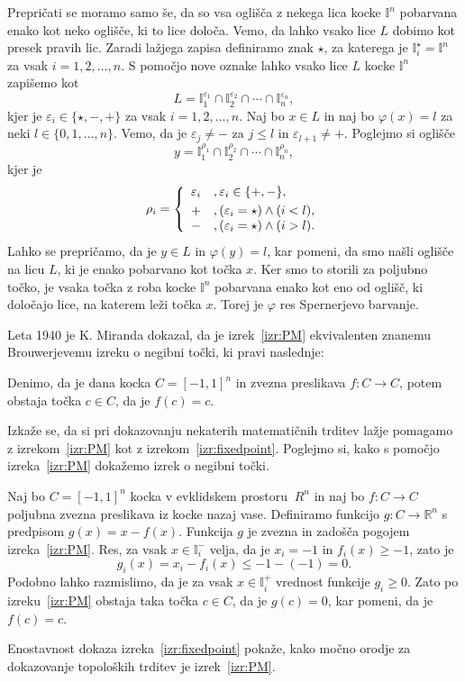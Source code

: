 \documentclass[mat1]{fmfdelo}
\newcommand{\R}{\mathbb R}
\newcommand{\I}{\mathbb I}
\newcommand{\0}{0}
\begin{document}
\begin{dokaz}
Prepričati se moramo samo še, da so vsa oglišča z nekega lica kocke $\I^n$ pobarvana enako kot neko oglišče, ki to lice določa. Vemo, da lahko vsako lice $L$ dobimo kot presek pravih lic. Zaradi lažjega zapisa definiramo znak $\star$, za katerega je $\I_i^{\star} = \I^n$ za vsak $i = 1, 2, \dots, n$. S pomočjo nove oznake lahko vsako lice $L$ kocke $\I^n$ zapišemo kot 
$$L = \I_1^{\varepsilon_1} \cap \I_2^{\varepsilon_2} \cap \cdots \cap \I_n^{\varepsilon_n},$$
kjer je $\varepsilon_i \in \{ \star, -, + \}$ za vsak $i = 1, 2, \dots, n$. Naj bo $x \in L$ in naj bo $\varphi (x) = l$ za neki $l \in \{ 0, 1, \dots, n \}$. Vemo, da je $\varepsilon_j \neq -$ za $j \leq l$ in $\varepsilon_{l+1} \neq +$. Poglejmo si oglišče 
$$y = \I_1^{\rho_1} \cap \I_2^{\rho_2} \cap \cdots \cap \I_n^{\rho_n},$$
kjer je
\[  \rho_i =  \left\{
\begin{array}{cl}\vspace{3pt}
	\varepsilon_i &, \varepsilon_i \in \{ +, - \},\\
	+ &, (\varepsilon_i = \star) \land (i < l), \\
	- &, (\varepsilon_i = \star) \land (i > l). \\
\end{array} 
\right. \]
Lahko se prepričamo, da je $y \in L$ in $\varphi (y) = l$, kar pomeni, da smo našli oglišče na licu $L$, ki je enako pobarvano kot točka $x$. Ker smo to storili za poljubno točko, je vsaka točka z roba kocke $\I^n$ pobarvana enako kot eno od oglišč, ki določajo lice, na katerem leži točka $x$. Torej je $\varphi$ res Spernerjevo barvanje.
\end{dokaz}
Leta 1940 je K. Miranda dokazal, da je izrek~\ref{izr:PM} ekvivalenten znanemu Brouwerjevemu izreku o negibni točki, ki pravi naslednje:
\begin{izrek}\label{izr:fixedpoint}
Denimo, da je dana kocka $C = [-1, 1]^n$ in zvezna preslikava $f : C \to C$, potem obstaja točka $c \in C$, da je $f(c) = c$.
\end{izrek}
Izkaže se, da si pri dokazovanju nekaterih matematičnih trditev lažje pomagamo z izrekom~\ref{izr:PM} kot z izrekom~\ref{izr:fixedpoint}. Poglejmo si, kako s pomočjo izreka~\ref{izr:PM} dokažemo izrek o negibni točki. 

\begin{dokaz}
Naj bo $C = [-1, 1]^n$ kocka v evklidskem prostoru $~R^n$ in naj bo $f : C \to C$ poljubna zvezna preslikava iz kocke nazaj vase. Definiramo funkcijo $g : C \to \R^n$ s predpisom $g(x) = x - f(x)$. Funkcija $g$ je zvezna in zadošča pogojem izreka~\ref{izr:PM}. Res, za vsak $x \in \I_i^-$ velja, da je $x_i = -1$ in $f_i(x) \geq -1$, zato je 
$$g_i(x) = x_i - f_i(x) \leq -1 - (-1) =0.$$
Podobno lahko razmislimo, da je za vsak $x \in \I_i^+$ vrednost funkcije $g_i \geq 0$. Zato po izreku~\ref{izr:PM} obstaja taka točka $c \in C$, da je $g(c) = 0$, kar pomeni, da je $f(c) = c$.
\end{dokaz}
Enostavnost dokaza izreka~\ref{izr:fixedpoint} pokaže, kako močno orodje za dokazovanje topoloških trditev je izrek~\ref{izr:PM}.
\end{document}
